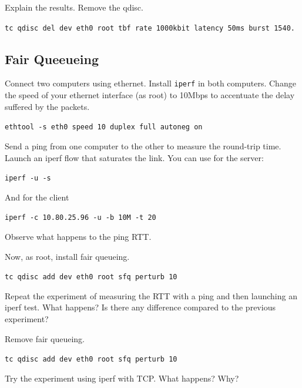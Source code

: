 Explain the results.
Remove the qdisc.

\texttt{tc qdisc del dev eth0 root tbf rate 1000kbit latency 50ms burst 1540.}

\subsection{Fair Queeueing}

Connect two computers using ethernet.
Install \texttt{iperf} in both computers.
Change the speed of your ethernet interface (as root) to 10Mbps to accentuate the delay suffered by the packets.

\texttt{ethtool -s eth0 speed 10 duplex full autoneg on}

Send a ping from one computer to the other to measure the round-trip time.
Launch an iperf flow that saturates the link.
You can use for the server:

\texttt{iperf -u -s}

And for the client

\texttt{iperf -c 10.80.25.96 -u -b 10M -t 20}

Observe what happens to the ping RTT.

Now, as root, install fair queueing.

\texttt{tc qdisc add dev eth0 root sfq perturb 10}

Repeat the experiment of measuring the RTT with a ping and then launching an iperf test.
What happens?
Is there any difference compared to the previous experiment?

Remove fair queueing.

\texttt{tc qdisc add dev eth0 root sfq perturb 10}

Try the experiment using iperf with TCP. 
What happens? Why?

